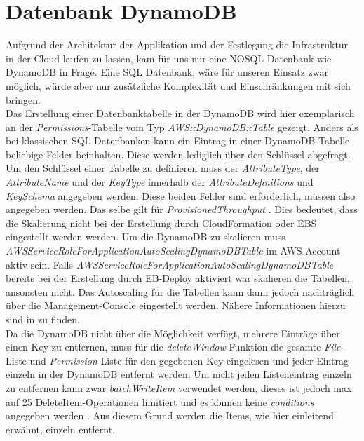 \documentclass[a4paper, 12pt]{scrreprt}
\renewcommand\_{\textunderscore\allowbreak}
\begin{document}
\section{Datenbank DynamoDB}
Aufgrund der Architektur der Applikation und der Festlegung die Infrastruktur in der Cloud laufen zu lassen, kam für uns nur eine NOSQL Datenbank wie DynamoDB in Frage. Eine SQL Datenbank, wäre für unseren Einsatz zwar möglich, würde aber nur zusätzliche Komplexität und Einschränkungen mit sich bringen. \\
Das Erstellung einer Datenbanktabelle in der DynamoDB wird hier exemplarisch an der \textit{Permissions}-Tabelle vom Typ \textit{AWS::DynamoDB::Table} gezeigt. Anders als bei klassischen SQL-Datenbanken kann ein Eintrag in einer DynamoDB-Tabelle beliebige Felder beinhalten. Diese werden lediglich über den Schlüssel abgefragt. Um den Schlüssel einer Tabelle zu definieren muss der \textit{AttributeType}, der \textit{AttributeName} und der \textit{KeyType} innerhalb der \textit{AttributeDefinitions} und \textit{KeySchema} angegeben werden. Diese beiden Felder sind erforderlich, müssen also angegeben werden. Das selbe gilt für \textit{ProvisionedThroughput} \cite{AWSDa}.
Dies bedeutet, dass die Skalierung nicht bei der Erstellung durch CloudFormation oder EBS eingestellt werden werden. Um die DynamoDB zu skalieren muss \textit{AWSServiceRoleForApplicationAutoScaling\_DynamoDBTable} im AWS-Account aktiv sein. Falls \textit{AWSServiceRoleForApplicationAutoScaling\_DynamoDBTable} bereits bei der Erstellung durch EB-Deploy aktiviert war skalieren die Tabellen,  ansonsten nicht. Das Autoscaling für die Tabellen kann dann jedoch nachträglich über die Management-Console eingestellt werden. Nähere Informationen hierzu sind in \cite{AWSDb} zu finden.
\\

Da die DynamoDB nicht über die Möglichkeit verfügt, mehrere Einträge über einen Key zu entfernen, muss für die \textit{deleteWindow}-Funktion die gesamte \textit{File}-Liste und \textit{Permission}-Liste für den gegebenen Key eingelesen und jeder Eintrag einzeln in der DynamoDB entfernt werden.
Um nicht jeden Listeneintrag einzeln zu entfernen kann zwar \textit{batchWriteItem} verwendet werden, dieses ist jedoch max. auf 25 DeleteItem-Operationen limitiert und es können keine \textit{conditions} angegeben werden \cite{AWSJSSDKD}. Aus diesem Grund werden die Items, wie hier einleitend erwähnt, einzeln entfernt.
\end{document}
